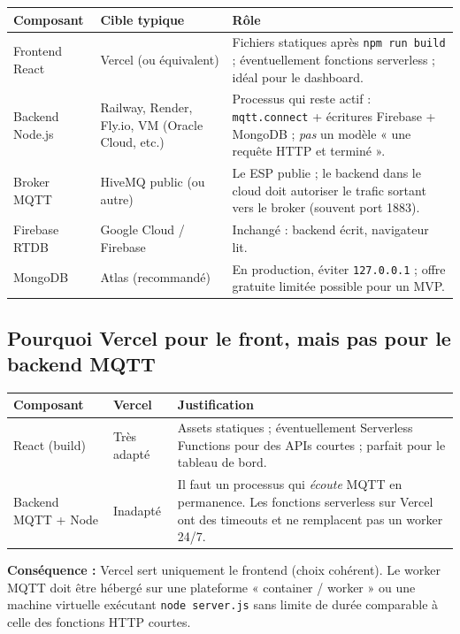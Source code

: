 \documentclass[11pt,a4paper]{article}
\begin{document}
\begin{center}
\begin{tabular}{@{}p{3.2cm}p{4.5cm}p{6.5cm}@{}}
\toprule
\textbf{Composant} & \textbf{Cible typique} & \textbf{Rôle} \\
\midrule
Frontend React & Vercel (ou équivalent) & Fichiers statiques après \texttt{npm run build} ; éventuellement fonctions serverless ; idéal pour le dashboard. \\
Backend Node.js & Railway, Render, Fly.io, VM (Oracle Cloud, etc.) & Processus qui reste actif : \texttt{mqtt.connect} + écritures Firebase + MongoDB ; \emph{pas} un modèle « une requête HTTP et terminé ». \\
Broker MQTT & HiveMQ public (ou autre) & Le ESP publie ; le backend dans le cloud doit autoriser le trafic sortant vers le broker (souvent port 1883). \\
Firebase RTDB & Google Cloud / Firebase & Inchangé : backend écrit, navigateur lit. \\
MongoDB & Atlas (recommandé) & En production, éviter \texttt{127.0.0.1} ; offre gratuite limitée possible pour un MVP. \\
\bottomrule
\end{tabular}
\end{center}

\subsection{Pourquoi Vercel pour le front, mais pas pour le backend MQTT}

\begin{center}
\begin{tabular}{@{}p{3.5cm}p{2.2cm}p{8cm}@{}}
\toprule
\textbf{Composant} & \textbf{Vercel} & \textbf{Justification} \\
\midrule
React (build) & Très adapté & Assets statiques ; éventuellement Serverless Functions pour des APIs courtes ; parfait pour le tableau de bord. \\
Backend MQTT + Node & Inadapté & Il faut un processus qui \emph{écoute} MQTT en permanence. Les fonctions serverless sur Vercel ont des timeouts et ne remplacent pas un worker 24/7. \\
\bottomrule
\end{tabular}
\end{center}

\noindent
\textbf{Conséquence :} Vercel sert uniquement le frontend (choix cohérent). Le worker MQTT doit être hébergé sur une plateforme « container / worker » ou une machine virtuelle exécutant \texttt{node server.js} sans limite de durée comparable à celle des fonctions HTTP courtes.
\end{document}
